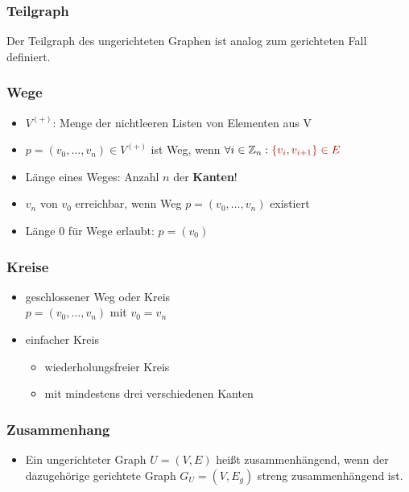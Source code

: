 \documentclass{article}
\newcommand{\Z}{\mathbb{Z}} %
\newcommand{\strongColor}[1]{\textcolor{strongColor}{#1}}
\newcommand{\strong}[1]{\textbf{\strongColor{#1}}}
\newcommand{\important}[1]{\textcolor{importantColor}{#1}}
\newcommand{\set}[1]{\{#1\}}
\begin{document}
\subsubsection{Teilgraph}
Der Teilgraph des ungerichteten Graphen ist analog zum gerichteten Fall definiert.

\subsubsection{Wege}
\begin{itemize}
    \item \important{$V^{(+)}$}: Menge der nichtleeren Listen von Elementen aus V
    \item \important{$p=(v_0,\dots, v_n)\in V^{(+)}$} ist \important{Weg}, wenn $\forall i \in \Z_n: \important{\set{v_i,v_{i+1}} \in E}$
    \item \important{Länge eines Weges}: Anzahl $n$ der \strong{Kanten}!
    \item $v_n$ von $v_0$ \important{erreichbar}, wenn Weg $p=(v_0,\dots, v_n)$ existiert
    \item Länge 0 für Wege erlaubt: $p=(v_0)$
\end{itemize}

\subsubsection{Kreise}
\begin{itemize}
    \item \important{geschlossener Weg} oder \important{Kreis}\\
    $p=(v_0,\dots,v_n)$ mit $v_0=v_n$
    \item \important{einfacher Kreis}
    \begin{itemize}
        \item wiederholungsfreier Kreis
        \item mit mindestens \important{drei} verschiedenen Kanten
    \end{itemize}
\end{itemize}

\subsubsection{Zusammenhang}
\begin{itemize}
    \item Ein ungerichteter Graph $U=(V,E)$ heißt \important{zusammenhängend}, wenn der dazugehörige gerichtete Graph $G_U=(V,E_g)$ streng zusammenhängend ist.
\end{itemize}
\end{document}
